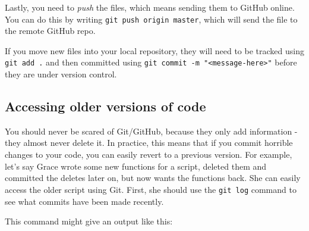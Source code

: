 \documentclass[
]{book}
\newenvironment{Shaded}{\begin{snugshade}}{\end{snugshade}}
\newcommand{\NormalTok}[1]{#1}
\newcommand{\SpecialCharTok}[1]{\textcolor[rgb]{0.00,0.00,0.00}{#1}}
\begin{document}
Lastly, you need to \emph{push} the files, which means sending them to GitHub online. You can do this by writing \texttt{git\ push\ origin\ master}, which will send the file to the remote GitHub repo.

\begin{Shaded}
\end{Shaded}

If you move new files into your local repository, they will need to be tracked using \texttt{git\ add\ .} and then committed using \texttt{git\ commit\ -m\ "\textless{}message-here\textgreater{}"} before they are under version control.

\hypertarget{accessing-older-versions-of-code}{%
\subsection{Accessing older versions of code}\label{accessing-older-versions-of-code}}

You should never be scared of Git/GitHub, because they only add information - they almost never delete it. In practice, this means that if you commit horrible changes to your code, you can easily revert to a previous version. For example, let's say Grace wrote some new functions for a script, deleted them and committed the deletes later on, but now wants the functions back. She can easily access the older script using Git. First, she should use the \texttt{git\ log} command to see what commits have been made recently.

\begin{Shaded}
\end{Shaded}

This command might give an output like this:
\end{document}
